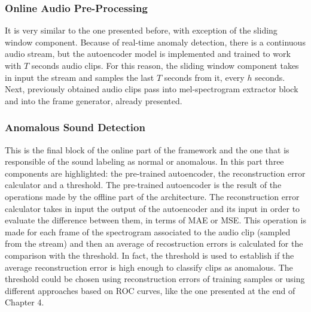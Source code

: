 \subsubsection{Online Audio Pre-Processing}
It is very similar to the one presented before, with exception of the sliding window component. Because of real-time anomaly detection, there is a continuous audio stream, but the autoencoder model is implemented and trained to work with $T$ seconds audio clips. For this reason, the sliding window component takes in input the stream and samples the last $T$ seconds from it, every $h$ seconds. Next, previously obtained audio clips pass into mel-spectrogram extractor block and into the frame generator, already presented. 
\subsubsection{Anomalous Sound Detection}
This is the final block of the online part of the framework and the one that is responsible of the sound labeling as normal or anomalous. In this part three components are highlighted: the pre-trained autoencoder, the reconstruction error calculator and a threshold. The pre-trained autoencoder is the result of the operations made by the offline part of the architecture. The reconstruction error calculator takes in input the output of the autoencoder and its input in order to evaluate the difference between them, in terms of MAE or MSE. This operation is made for each frame of the spectrogram associated to the audio clip (sampled from the stream) and then an average of recostruction errors is calculated for the comparison with the threshold. In fact, the threshold is used to establish if the average reconstruction error is high enough to classify clips as anomalous. The threshold could be chosen using reconstruction errors of training samples or using different approaches based on ROC curves, like the one presented at the end of Chapter 4.
